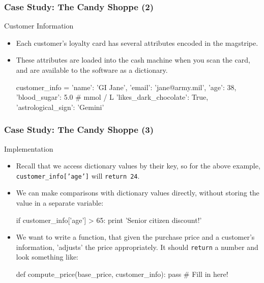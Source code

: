 \documentclass[10pt]{beamer}
\begin{document}
\begin{frame}[fragile]
  \frametitle{Case Study: The Candy Shoppe (2)}
  \begin{block}{Customer Information}
    \begin{itemize}
      \item Each customer's loyalty card has several attributes encoded in the magstripe.
      \item These attributes are loaded into the cash machine when you scan the card, and are available to the software as a dictionary.
        \begin{pythoncode}
  customer_info = {
    'name': 'GI Jane',
    'email': 'jane@army.mil',
    'age': 38,
    'blood_sugar': 5.0 # mmol / L
    'likes_dark_chocolate': True,
    'astrological_sign': 'Gemini'
  }
        \end{pythoncode}
    \end{itemize}
  \end{block}
\end{frame}

\begin{frame}[fragile]
  \frametitle{Case Study: The Candy Shoppe (3)}
  \begin{block}{Implementation}
    \begin{itemize}
      \item Recall that we access dictionary values by their key, so for the above example, \texttt{customer\_info['age']} will \texttt{return 24}.
      \item We can make comparisons with dictionary values directly, without storing the value in a separate variable:
        \begin{pythoncode}
  if customer_info['age'] > 65:
    print 'Senior citizen discount!'
        \end{pythoncode}
      \item We want to write a function, that given the purchase price and a customer's information, 'adjusts' the price appropriately.
        It should \texttt{return} a number and look something like:
        \begin{pythoncode}
  def compute_price(base_price, customer_info):
    pass # Fill in here!
        \end{pythoncode}
    \end{itemize}
  \end{block}
\end{frame}
\end{document}
